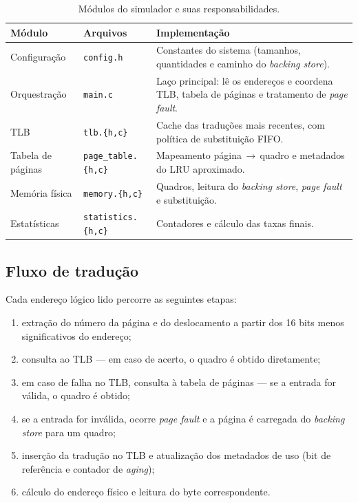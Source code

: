 \documentclass[11pt,a4paper]{article}
\begin{document}
\begin{table}[h]
\centering
\begin{tabular}{l l p{7.2cm}}
\toprule
\textbf{Módulo} & \textbf{Arquivos} & \textbf{Implementação} \\
\midrule
Configuração      & \texttt{config.h}            & Constantes do sistema (tamanhos, quantidades e caminho do \textit{backing store}). \\
Orquestração      & \texttt{main.c}              & Laço principal: lê os endereços e coordena TLB, tabela de páginas e tratamento de \textit{page fault}. \\
TLB               & \texttt{tlb.\{h,c\}}         & Cache das traduções mais recentes, com política de substituição FIFO. \\
Tabela de páginas & \texttt{page\_table.\{h,c\}} & Mapeamento página\,$\rightarrow$\,quadro e metadados do LRU aproximado. \\
Memória física    & \texttt{memory.\{h,c\}}      & Quadros, leitura do \textit{backing store}, \textit{page fault} e substituição. \\
Estatísticas      & \texttt{statistics.\{h,c\}}  & Contadores e cálculo das taxas finais. \\
\bottomrule
\end{tabular}
\caption{Módulos do simulador e suas responsabilidades.}
\label{tab:modulos}
\end{table}

\subsection{Fluxo de tradução}
Cada endereço lógico lido percorre as seguintes etapas:
\begin{enumerate}
    \item extração do número da página e do deslocamento a partir dos 16 bits
          menos significativos do endereço;
    \item consulta ao TLB --- em caso de acerto, o quadro é obtido diretamente;
    \item em caso de falha no TLB, consulta à tabela de páginas --- se a entrada
          for válida, o quadro é obtido;
    \item se a entrada for inválida, ocorre \textit{page fault} e a página é
          carregada do \textit{backing store} para um quadro;
    \item inserção da tradução no TLB e atualização dos metadados de uso
          (bit de referência e contador de \textit{aging});
    \item cálculo do endereço físico e leitura do byte correspondente.
\end{enumerate}
\end{document}
